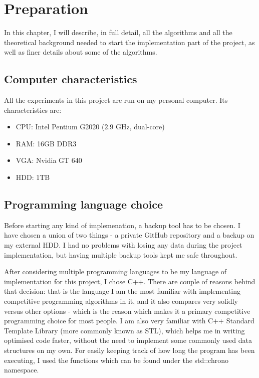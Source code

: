 \documentclass[12pt,twoside,notitlepage]{report}
\begin{document}


\cleardoublepage



\chapter{Preparation}

In this chapter, I will describe, in full detail, all the algorithms and all the theoretical background needed to start the implementation part of the project, as well as finer details about some of the algorithms.

\section{Computer characteristics}

All the experiments in this project are run on my personal computer. Its characteristics are:

\begin{itemize}
\item CPU: Intel Pentium G2020 ($2.9$ GHz, dual-core)
\item RAM: 16GB DDR3
\item VGA: Nvidia GT 640
\item HDD: 1TB
\end{itemize}

\section{Programming language choice}

Before starting any kind of implemenation, a backup tool has to be chosen. I have chosen a union of two things - a private GitHub repository and a backup on my external HDD. I had no problems with losing any data during the project implementation, but having multiple backup tools kept me safe throughout.

After considering multiple programming languages to be my language of implementation for this project, I chose C++. There are couple of reasons behind that decision: that is the language I am the most familiar with implementing competitive programming algorithms in it, and it also compares very solidly versus other options - which is the reason which makes it a primary competitive programming choice for most people. I am also very familiar with C++ Standard Template Library (more commonly known as STL), which helps me in writing optimised code faster, without the need to implement some commonly used data structures on my own. For easily keeping track of how long the program has been executing, I used the functions which can be found under the std::chrono namespace.
\end{document}
